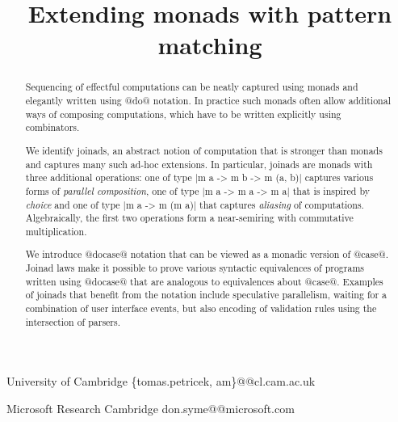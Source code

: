 \documentclass[preprint]{sigplanconf}
\begin{document}
\copyrightdata{[to be supplied]} 


\title{Extending monads with pattern matching}

           {University of Cambridge}
           {\{tomas.petricek, am\}@@cl.cam.ac.uk}

           {Microsoft Research Cambridge}
           {don.syme@@microsoft.com}

\maketitle

\begin{abstract}
Sequencing of effectful computations can be neatly captured using monads and elegantly written using 
@do@ notation. In practice such monads often allow additional ways of composing computations, 
which have to be written explicitly using combinators.

We identify joinads, an abstract notion of computation that is stronger than monads and captures
many such ad-hoc extensions. In particular, joinads are monads with three additional operations: 
one of type |m a -> m b -> m (a, b)| captures various forms of \textit{parallel composition}, 
one of type |m a -> m a -> m a| that is inspired by \textit{choice} and one of type |m a -> m (m a)| 
that captures \textit{aliasing} of computations. Algebraically, the first two operations form a 
near-semiring with commutative multiplication.

We introduce @docase@ notation that can be viewed as a monadic version of @case@. Joinad laws
make it possible to prove various syntactic equivalences of programs written using @docase@ 
that are analogous to equivalences about @case@. Examples of joinads that benefit from the notation
include speculative parallelism, waiting for a combination of user interface events, but also 
encoding of validation rules using the intersection of parsers. 
\end{abstract}


\end{document}
